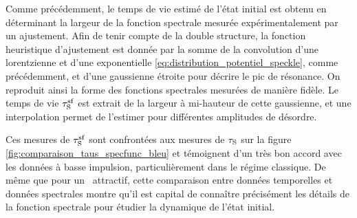 Comme précédemment, le temps de vie estimé de l'état initial est obtenu en déterminant la largeur de la fonction spectrale mesurée expérimentalement par un ajustement. Afin de tenir compte de la double structure, la fonction heuristique d'ajustement est donnée par la somme de la convolution d'une lorentzienne et d'une exponentielle \ref{eq:distribution_potentiel_speckle}, comme précédemment, et d'une gaussienne étroite pour décrire le pic de résonance. On reproduit ainsi la forme des fonctions spectrales mesurées de manière fidèle. Le temps de vie $\tau_{\mathrm{S}}^{\mathrm{sf}}$ est extrait de la largeur à mi-hauteur de cette gaussienne, et une interpolation permet de l'estimer pour différentes amplitudes de désordre. 

Ces mesures de $\tau_{\mathrm{S}}^{\mathrm{sf}}$ sont confrontées aux mesures de $\tau_{\mathrm{S}}$ sur la figure \ref{fig:comparaison_taus_specfunc_bleu} et témoignent d'un très bon accord avec les données à basse impulsion, particulièrement dans le régime classique. De même que pour un \speckle\ attractif, cette comparaison entre données temporelles et données spectrales montre qu'il est capital de connaître précisément les détails de la fonction spectrale pour étudier la dynamique de l'état initial.




